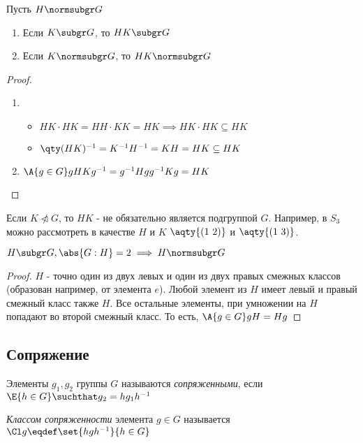 \begin{theorem}
  Пусть $H\normsubgr G$
  \begin{enumerate}
    \item Если $K \subgr G$, то $HK \subgr G$
    \item Если $K \normsubgr G$, то $HK \normsubgr G$
  \end{enumerate}
\end{theorem}
\begin{proof}
  \theoremlistshack
  \begin{enumerate}
    \item \begin{itemize}
            \item $HK\cdot HK=HH\cdot KK=HK\implies HK\cdot HK \subseteq HK$
            \item $\qty(HK)^{-1}=K^{-1} H^{-1}=KH=HK\subseteq HK$
          \end{itemize}
    \item $\A{g\in G} gHKg^{-1}=g^{-1} Hgg^{-1} Kg=HK$
  \end{enumerate}
\end{proof}
\begin{remark}
  Если $K\ntriangleleft G$, то $HK$ - не обязательно является подгруппой $G$. Например, в $S_3$ можно рассмотреть в качестве $H$ и $K$ $\aqty{(1\ 2)}$ и $\aqty{(1\ 3)}$.
\end{remark}
\begin{theorem}
  $H\subgr G, \abs{G:H}=2 \implies H\normsubgr G$
\end{theorem}
\begin{proof}
  $H$ - точно один из двух левых и один из двух правых смежных классов (образован например, от элемента $e$). Любой элемент из $H$ имеет левый и правый смежный класс также $H$. Все остальные элементы, при умножении на $H$ попадают во второй смежный класс. То есть, $\A{g\in G} gH=Hg$
\end{proof}

\subsection{Сопряжение}
\begin{definition}
  Элементы $g_1, g_2$ группы $G$ называются \emph{сопряженными}, если $\E{h\in G}\suchthat g_2=hg_1h^{-1}$
\end{definition}

\begin{definition}
  \sloppy \emph{Классом сопряженности} элемента $g\in G$ называется $\Cl g\eqdef \set{hgh^{-1}}{h\in G}$
\end{definition}

